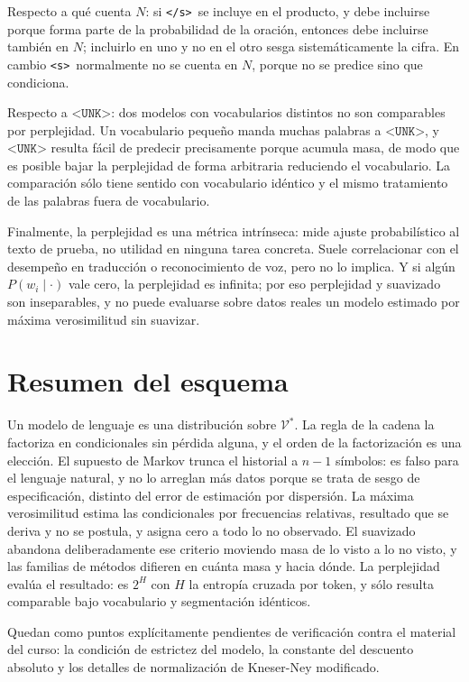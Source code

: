 \documentclass[11pt,letterpaper]{article}
\newcommand{\Vocab}{\mathcal{V}}
\newcommand{\bos}{\texttt{<s>}}
\newcommand{\eos}{\texttt{</s>}}
\newcommand{\unk}{\texttt{<UNK>}}
\begin{document}
Respecto a qué cuenta $N$: si \eos\ se incluye en el producto, y debe incluirse
porque forma parte de la probabilidad de la oración, entonces debe incluirse
también en $N$; incluirlo en uno y no en el otro sesga sistemáticamente la
cifra. En cambio \bos\ normalmente no se cuenta en $N$, porque no se predice
sino que condiciona.

Respecto a $\unk$: dos modelos con vocabularios distintos no son comparables por
perplejidad. Un vocabulario pequeño manda muchas palabras a $\unk$, y $\unk$
resulta fácil de predecir precisamente porque acumula masa, de modo que es
posible bajar la perplejidad de forma arbitraria reduciendo el vocabulario. La
comparación sólo tiene sentido con vocabulario idéntico y el mismo tratamiento
de las palabras fuera de vocabulario.

Finalmente, la perplejidad es una métrica intrínseca: mide ajuste probabilístico
al texto de prueba, no utilidad en ninguna tarea concreta. Suele correlacionar
con el desempeño en traducción o reconocimiento de voz, pero no lo implica. Y si
algún $P(w_i\mid\cdot)$ vale cero, la perplejidad es infinita; por eso
perplejidad y suavizado son inseparables, y no puede evaluarse sobre datos
reales un modelo estimado por máxima verosimilitud sin suavizar.

\section{Resumen del esquema}

Un modelo de lenguaje es una distribución sobre $\Vocab^*$. La regla de la
cadena la factoriza en condicionales sin pérdida alguna, y el orden de la
factorización es una elección. El supuesto de Markov trunca el historial a $n-1$
símbolos: es falso para el lenguaje natural, y no lo arreglan más datos porque
se trata de sesgo de especificación, distinto del error de estimación por
dispersión. La máxima verosimilitud estima las condicionales por frecuencias
relativas, resultado que se deriva y no se postula, y asigna cero a todo lo no
observado. El suavizado abandona deliberadamente ese criterio moviendo masa de
lo visto a lo no visto, y las familias de métodos difieren en cuánta masa y
hacia dónde. La perplejidad evalúa el resultado: es $2^{H}$ con $H$ la entropía
cruzada por token, y sólo resulta comparable bajo vocabulario y segmentación
idénticos.

Quedan como puntos explícitamente pendientes de verificación contra el material
del curso: la condición de estrictez del modelo, la constante del descuento
absoluto y los detalles de normalización de Kneser-Ney modificado.
\end{document}
